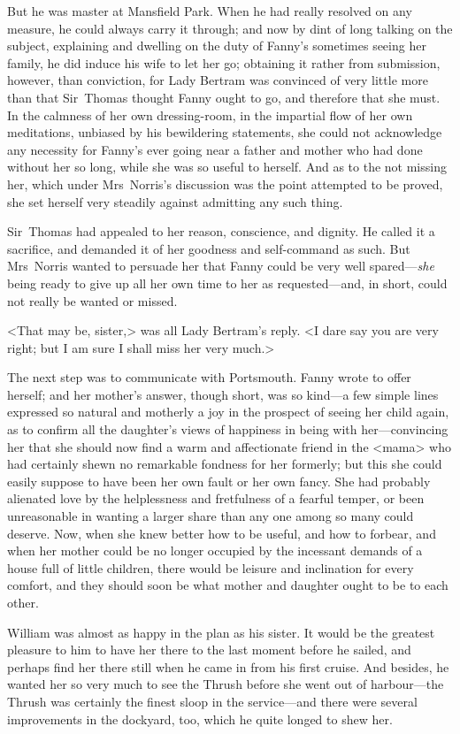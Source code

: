 But he was master at Mansfield Park. When he had really resolved on any measure, he could always carry it through; and now by dint of long talking on the subject, explaining and dwelling on the duty of Fanny's sometimes seeing her family, he did induce his wife to let her go; obtaining it rather from submission, however, than conviction, for Lady Bertram was convinced of very little more than that Sir~Thomas thought Fanny ought to go, and therefore that she must. In the calmness of her own dressing-room, in the impartial flow of her own meditations, unbiased by his bewildering statements, she could not acknowledge any necessity for Fanny's ever going near a father and mother who had done without her so long, while she was so useful to herself. And as to the not missing her, which under Mrs~Norris's discussion was the point attempted to be proved, she set herself very steadily against admitting any such thing.

Sir~Thomas had appealed to her reason, conscience, and dignity. He called it a sacrifice, and demanded it of her goodness and self-command as such. But Mrs~Norris wanted to persuade her that Fanny could be very well spared—\textit{she}  being ready to give up all her own time to her as requested—and, in short, could not really be wanted or missed.

<That may be, sister,> was all Lady Bertram's reply. <I dare say you are very right; but I am sure I shall miss her very much.>

The next step was to communicate with Portsmouth. Fanny wrote to offer herself; and her mother's answer, though short, was so kind—a few simple lines expressed so natural and motherly a joy in the prospect of seeing her child again, as to confirm all the daughter's views of happiness in being with her—convincing her that she should now find a warm and affectionate friend in the <mama> who had certainly shewn no remarkable fondness for her formerly; but this she could easily suppose to have been her own fault or her own fancy. She had probably alienated love by the helplessness and fretfulness of a fearful temper, or been unreasonable in wanting a larger share than any one among so many could deserve. Now, when she knew better how to be useful, and how to forbear, and when her mother could be no longer occupied by the incessant demands of a house full of little children, there would be leisure and inclination for every comfort, and they should soon be what mother and daughter ought to be to each other.

William was almost as happy in the plan as his sister. It would be the greatest pleasure to him to have her there to the last moment before he sailed, and perhaps find her there still when he came in from his first cruise. And besides, he wanted her so very much to see the Thrush before she went out of harbour—the Thrush was certainly the finest sloop in the service—and there were several improvements in the dockyard, too, which he quite longed to shew her.

